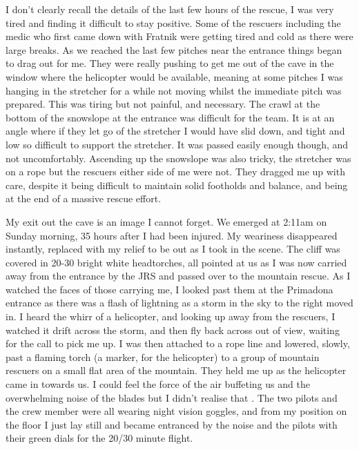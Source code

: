    I don’t clearly recall the details of the last few hours of the rescue, I was very tired and finding it difficult to stay positive. Some of the rescuers including the medic who first came down with Fratnik were getting tired and cold as there were large breaks. As we reached the last few pitches near the entrance things began to drag out for me. They were really pushing to get me out of the cave in the window where the helicopter would be available, meaning at some pitches I was hanging in the stretcher for a while not moving whilst the immediate pitch was prepared. This was tiring but not painful, and necessary. The crawl at the bottom of the snowslope at the entrance was difficult for the team. It is at an angle where if they let go of the stretcher I would have slid down, and tight and low so difficult to support the stretcher. It was passed easily enough though, and not uncomfortably. Ascending up the snowslope was also tricky, the stretcher was on a rope but the rescuers either side of me were not. They dragged me up with care, despite it being difficult to maintain solid footholds and balance, and being at the end of a massive rescue effort.

    My exit out the cave is an image I cannot forget. We emerged at 2:11am on Sunday morning, 35 hours after I had been injured. My weariness disappeared instantly, replaced with my relief to be out as I took in the scene. The cliff was covered in 20-30 bright white headtorches, all pointed at us as I was now carried away from the entrance by the JRS and passed over to the mountain rescue. As I watched the faces of those carrying me, I looked past them at the Primadona entrance as there was a flash of lightning as a storm in the sky to the right moved in. I heard the whirr of a helicopter, and looking up away from the rescuers, I watched it drift across the storm, and then fly back across out of view, waiting for the call to pick me up. I was then attached to a rope line and lowered, slowly, past a flaming torch (a marker, for the helicopter) to a group of mountain rescuers on a small flat area of the mountain. They held me up as the helicopter came in towards us. I could feel the force of the air buffeting us and the overwhelming noise of the blades but I didn’t realise that . The two pilots and the crew member were all wearing night vision goggles, and from my position on the floor I just lay still and became entranced by the noise and the pilots with their green dials for the 20/30 minute flight.

